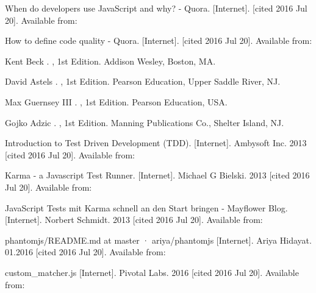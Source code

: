 \documentclass[11pt]{article}
\begin{document}
\begin{thebibliography}{9}

 When do developers use JavaScript and why? - Quora. [Internet]. [cited 2016 Jul 20]. Available from:

 How to define code quality - Quora. [Internet]. [cited 2016 Jul 20]. Available from:

 Kent Beck
.
, 1st Edition.
\newblock Addison Wesley, Boston, MA.

 David Astels
.
, 1st Edition.
\newblock Pearson Education, Upper Saddle River, NJ.

 Max Guernsey III 
.
, 1st Edition.
\newblock Pearson Education, USA.

 Gojko Adzic
.
, 1st Edition.
\newblock Manning Publications Co., Shelter Island, NJ.

 Introduction to Test Driven Development (TDD). [Internet]. Ambysoft Inc. 2013 [cited 2016 Jul 20]. Available from: 

 Karma - a Javascript Test Runner. [Internet]. Michael G Bielski. 2013 [cited 2016 Jul 20]. Available from:

 JavaScript Tests mit Karma schnell an den Start bringen - Mayflower Blog. [Internet]. Norbert Schmidt. 2013 [cited 2016 Jul 20]. Available from:

 phantomjs/README.md at master · ariya/phantomjs [Internet]. Ariya Hidayat. 01.2016 [cited 2016 Jul 20]. Available from:

 custom\_matcher.js [Internet]. Pivotal Labs. 2016 [cited 2016 Jul 20]. Available from:


\end{thebibliography}
\end{document}
